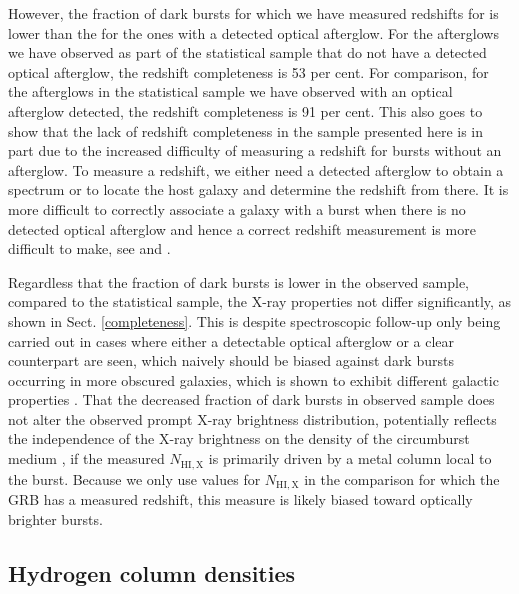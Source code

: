 \documentclass{aa}    %
\begin{document}
However, the fraction of dark bursts for which we have measured redshifts for is
lower than the for the ones with a detected optical afterglow. For the
afterglows we have observed as part of the statistical sample that do not have a
detected optical afterglow, the redshift completeness is 53 per cent. For
comparison, for the afterglows in the statistical sample we have observed with
an optical afterglow detected, the redshift completeness is 91 per cent. This
also goes to show that the lack of redshift completeness in the sample presented
here is in part due to the increased difficulty of measuring a redshift for
bursts without an afterglow. To measure a redshift, we either need a detected
afterglow to obtain a spectrum or to locate the host galaxy and determine the
redshift from there. It is more difficult to correctly associate a galaxy with a
burst when there is no detected optical afterglow and hence a correct redshift
measurement is more difficult to make, see \citet{Jakobsson2005, Levesque2010}
and \citet{Perley2017}.

Regardless that the fraction of dark bursts is lower in the observed sample,
compared to the statistical sample, the X-ray properties not differ
significantly, as shown in Sect. \ref{completeness}. This is despite
spectroscopic follow-up only being carried out in cases where either a
detectable optical afterglow or a clear counterpart are seen, which naively
should be biased against dark bursts occurring in more obscured galaxies, which
is shown to exhibit different galactic properties \citep{Perley2009,
	Kruhler2011, Rossi2012, Perley2013b, Perley2015b}. That the decreased fraction
of dark bursts in observed sample does not alter the observed prompt X-ray
brightness distribution, potentially reflects the independence of the X-ray
brightness on the density of the circumburst medium \citep{Freedman2001,
	Berger2003, Nysewander2009}, if the measured $N_{\mathrm{HI, X}}$ is primarily
driven by a metal column local to the burst. Because we only use values for
$N_{\mathrm{HI, X}}$ in the comparison for which the GRB has a measured
redshift, this measure is likely biased toward optically brighter bursts.

 \subsection{Hydrogen column densities}
\end{document}
